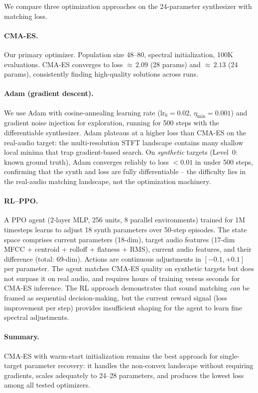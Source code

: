 We compare three optimization approaches on the 24-parameter synthesizer with matching loss.

\paragraph{CMA-ES.}
Our primary optimizer. Population size 48--80, spectral initialization, 100K evaluations.
CMA-ES converges to loss ${\approx}\,2.09$ (28 params) and ${\approx}\,2.13$ (24 params), consistently finding high-quality solutions across runs.

\paragraph{Adam (gradient descent).}
We use Adam with cosine-annealing learning rate ($\text{lr}_0 = 0.02$, $\eta_{\min} = 0.001$) and gradient noise injection for exploration, running for 500 steps with the differentiable synthesizer.
Adam plateaus at a higher loss than CMA-ES on the real-audio target: the multi-resolution STFT landscape contains many shallow local minima that trap gradient-based search.
On \emph{synthetic} targets (Level~0: known ground truth), Adam converges reliably to loss $< 0.01$ in under 500 steps, confirming that the synth and loss are fully differentiable -- the difficulty lies in the real-audio matching landscape, not the optimization machinery.

\paragraph{RL--PPO.}
A PPO agent (2-layer MLP, 256 units, 8 parallel environments) trained for 1M timesteps learns to adjust 18 synth parameters over 50-step episodes.
The state space comprises current parameters (18-dim), target audio features (17-dim MFCC + centroid + rolloff + flatness + RMS), current audio features, and their difference (total: 69-dim).
Actions are continuous adjustments in $[-0.1, +0.1]$ per parameter.
The agent matches CMA-ES quality on synthetic targets but does not surpass it on real audio, and requires hours of training versus seconds for CMA-ES inference.
The RL approach demonstrates that sound matching \emph{can} be framed as sequential decision-making, but the current reward signal (loss improvement per step) provides insufficient shaping for the agent to learn fine spectral adjustments.

\paragraph{Summary.}
CMA-ES with warm-start initialization remains the best approach for single-target parameter recovery: it handles the non-convex landscape without requiring gradients, scales adequately to 24--28 parameters, and produces the lowest loss among all tested optimizers.

